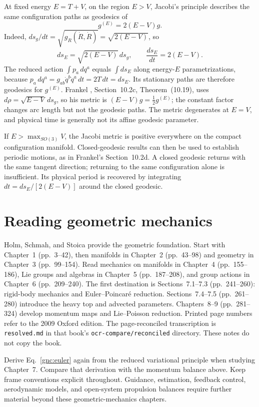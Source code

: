 At fixed energy $E=T+V$, on the region $E>V$, Jacobi's principle
describes the same configuration paths as geodesics of
\begin{equation}\label{gnc:jacobi-metric}
 g^{(E)}=2(E-V)g.
\end{equation}
Indeed, $ds_g/dt=\sqrt{g_R(\dot R,\dot R)}=\sqrt{2(E-V)}$, so
\begin{equation}\label{gnc:jacobi-time}
 ds_E=\sqrt{2(E-V)}\,ds_g,\qquad
 \frac{ds_E}{dt}=2(E-V).
\end{equation}
The reduced action $\int p_a\,dq^a$ equals $\int ds_E$ along
energy-$E$ parametrizations, because
$p_a\,dq^a=g_{ab}\dot q^b\dot q^a\,dt=2T\,dt=ds_E$.
Its stationary paths are therefore geodesics for $g^{(E)}$.
Frankel \cite{TFrankel2012}, Section~10.2c, Theorem~(10.19),
uses $d\rho=\sqrt{E-V}\,ds_g$, so his metric is
$(E-V)g=\tfrac12g^{(E)}$; the constant factor changes arc length
but not the geodesic paths. The metric degenerates at $E=V$, and
physical time is generally not its affine geodesic parameter.

If $E>\max_{SO(3)}V$, the Jacobi metric is positive everywhere on
the compact configuration manifold. Closed-geodesic results can then
be used to establish periodic motions, as in Frankel's Section~10.2d.
A closed geodesic returns with the same tangent direction; returning
to the same configuration alone is insufficient.
Its physical period is recovered by integrating
$dt=ds_E/[2(E-V)]$ around the closed geodesic.

\section{Reading geometric mechanics}
Holm, Schmah, and Stoica \cite{HSS2009} provide the geometric foundation.
Start with Chapter~1 (pp.~3--42), then manifolds in Chapter~2
(pp.~43--98) and geometry in Chapter~3 (pp.~99--154). Read mechanics on
manifolds in Chapter~4 (pp.~155--186), Lie groups and algebras in
Chapter~5 (pp.~187--208), and group actions in Chapter~6 (pp.~209--240).
The first destination is Sections~7.1--7.3 (pp.~241--260): rigid-body
mechanics and Euler--Poincar\'e reduction. Sections~7.4--7.5
(pp.~261--280) introduce the heavy top and advected parameters.
Chapters~8--9 (pp.~281--324) develop momentum maps and Lie--Poisson
reduction. Printed page numbers refer to the 2009 Oxford edition.
The page-reconciled transcription is \texttt{resolved.md} in that book's
\texttt{ocr-compare/reconciled} directory. These notes do not copy the book.

Derive Eq.~\eqref{gnc:euler} again from the reduced variational principle
when studying Chapter~7. Compare that derivation with the momentum balance
above. Keep frame conventions explicit throughout. Guidance, estimation,
feedback control, aerodynamic models, and open-system propulsion balances
require further material beyond these geometric-mechanics chapters.
